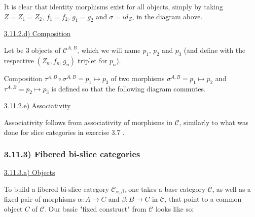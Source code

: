 It is clear that identity morphisms exist for all objects, simply by taking $Z = Z_1 = Z_2$, $f_1 = f_2$, $g_1 = g_2$ and $\sigma = id_Z$, in the diagram above.

\vspace{5mm}
\underline{3.11.2.d) Composition}

Let be 3 objects of $\mathcal{C}^{A,B}$, which we will name $p_1$, $p_2$ and $p_3$ (and define with the respective $(Z_n, f_n, g_n)$ triplet for $p_n$).

Composition $\tau^{A, B} \circ \sigma^{A, B} = p_1 \mapsto p_3$ of two morphisms $\sigma^{A, B} = p_1 \mapsto p_2$ and $\tau^{A, B} = p_2 \mapsto p_3$ is defined so that the following diagram commutes.


\vspace{5mm}
\underline{3.11.2.e) Associativity}

Associativity follows from associativity of morphisms in $\mathcal{C}$, similarly to what was done for slice categories in exercise 3.7 .



\subsubsection*{3.11.3) Fibered bi-slice categories}

\vspace{5mm}
\underline{3.11.3.a) Objects}

To build a fibered bi-slice category $\mathcal{C}_{\alpha, \beta}$, one takes a base category $\mathcal{C}$, as well as a fixed pair of morphisms $\alpha : A \to C$ and $\beta : B \to C$ in $\mathcal{C}$, that point to a common object $C$ of $\mathcal{C}$. Our basic "fixed construct" from $\mathcal{C}$ looks like so: 

